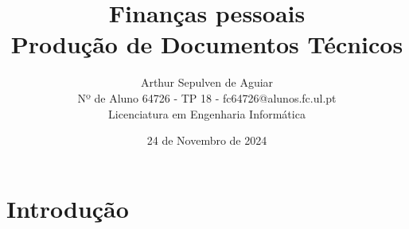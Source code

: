 \documentclass[a4paper,11pt]{report}
\title{
		\Huge{\textbf{Finanças pessoais}} \\
		\vskip 0.25cm
		\small{Produção de Documentos Técnicos} \\
}
\date{24 de Novembro de 2024}
\author{
	\small{ Arthur Sepulven de Aguiar } \\
	\small{ Nº de Aluno 64726 - TP 18 - fc64726@alunos.fc.ul.pt} \\
	\small{Licenciatura em Engenharia Informática} \\
}
\begin{document}
	\maketitle

	\tableofcontents %

	\chapter{Introdução}
\end{document}
